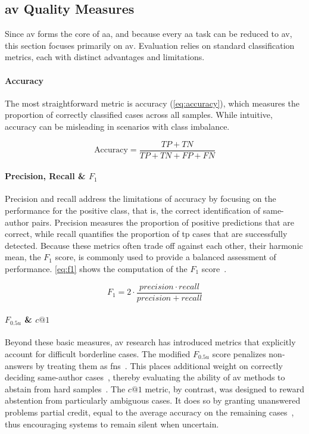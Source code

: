 \subsection{\acs{av} Quality Measures}
\label{subsec:av_quality_measures}

Since \ac{av} forms the core of \ac{aa}, and because every \ac{aa} task can be reduced to \ac{av}, this section focuses primarily on \ac{av}. 
Evaluation relies on standard classification metrics, each with distinct advantages and limitations.

\paragraph{Accuracy}
The most straightforward metric is accuracy (\autoref{eq:accuracy}), which measures the proportion of correctly classified cases across all samples. 
While intuitive, accuracy can be misleading in scenarios with class imbalance. 

\begin{equation}\label{eq:accuracy}
    \text{Accuracy} = \frac{TP + TN}{TP + TN + FP + FN}
\end{equation}

\paragraph{Precision, Recall \& $F_1$}
Precision and recall address the limitations of accuracy by focusing on the performance for the positive class, that is, the correct identification of same-author pairs. 
Precision measures the proportion of positive predictions that are correct, while recall quantifies the proportion of \ac{tp} cases that are successfully detected. 
Because these metrics often trade off against each other, their harmonic mean, the $F_1$ score, is commonly used to provide a balanced assessment of performance. 
\autoref{eq:f1} shows the computation of the $F_1$ score~\citep{neal_surveying_2018}.

\begin{equation}\label{eq:f1}
     F_1 = 2 \cdot \frac{precision \cdot recall}{precision + recall}
\end{equation}

\paragraph{$F_{0.5u}$ \& $c@1$}
Beyond these basic measures, \ac{av} research has introduced metrics that explicitly account for difficult borderline cases. 
The modified $F_{0.5u}$ score penalizes non-answers by treating them as \acp{fn}~\citep{bevendorff_overview_2024}. 
This places additional weight on correctly deciding same-author cases~\citep{weerasinghe_feature_vector_difference_2021}, thereby evaluating the ability of \ac{av} methods to abstain from hard samples~\citep{tyo_state_2022}. 
The $c@1$ metric, by contrast, was designed to reward abstention from particularly ambiguous cases. 
It does so by granting unanswered problems partial credit, equal to the average accuracy on the remaining cases~\citep{bevendorff_overview_2024}, thus encouraging systems to remain silent when uncertain.

